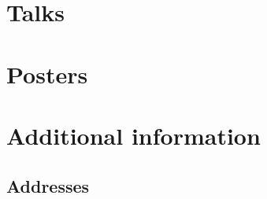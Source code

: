 \documentclass[12pt,letterpaper]{book}
\newenvironment{conf-abstract}[4][]{
 \needspace{10\baselineskip}
 \begin{center}
 { \renewcommand\textsuperscript[1]{}
 \phantomsection\addcontentsline{toc}{section}
 {\texorpdfstring{#2 (\emph{#3})}{#2 (#3)}}
 }
 {{\large\bfseries #2}\marginnote{#1}\par}
 \medskip
 {#3\par}
 \smallskip
 {\small #4\par}
 \end{center}
}{%
 \bigskip
 \hrule
 \bigskip
}
\newcommand{\indexauthors}[1]{%
 \forcsvlist{\index}{#1}
}
\begin{document}
\chapter{Talks}

%

\chapter{Posters}

%


%

%
%
%

\chapter{Additional information}

\section{Addresses}
\end{document}
